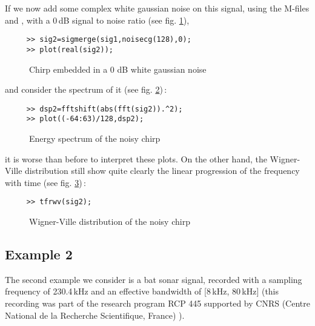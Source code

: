  If we now add some complex white gaussian noise on this signal, using the
M-files  and , with a 0\,dB signal to noise ratio (see
fig. \ref{In2fig4}),
\begin{verbatim}
     >> sig2=sigmerge(sig1,noisecg(128),0);
     >> plot(real(sig2));
\end{verbatim}
\begin{figure}[htb]
\epsfxsize=10cm
\epsfysize=6cm
\centerline{}
\caption{\label{In2fig4}Chirp embedded in a 0 dB white gaussian noise}
\end{figure}
and consider the spectrum of it (see fig. \ref{In2fig5})\,:
\begin{verbatim}
     >> dsp2=fftshift(abs(fft(sig2)).^2); 
     >> plot((-64:63)/128,dsp2);        
\end{verbatim}
\begin{figure}[htb]
\epsfxsize=10cm
\epsfysize=6cm
\centerline{}
\caption{\label{In2fig5}Energy spectrum of the noisy chirp}
\end{figure}
it is worse than before to interpret these plots. On the other hand, the
Wigner-Ville distribution still show quite clearly the linear progression
of the frequency with time (see fig. \ref{In2fig6})\,: 
\begin{verbatim}
     >> tfrwv(sig2);
\end{verbatim}
\begin{figure}[htb]
\epsfxsize=10cm
\epsfysize=8cm
\centerline{}
\caption{\label{In2fig6}Wigner-Ville distribution of the noisy chirp}
\end{figure}


\subsection{Example 2} 

The second example we consider is a bat sonar signal, recorded with a
sampling frequency of 230.4\,kHz and an effective bandwidth of [8\,kHz,
80\,kHz] (this recording was part of the research program RCP 445
supported by CNRS (Centre National de la Recherche Scientifique, France)
\cite{FLA86}).

